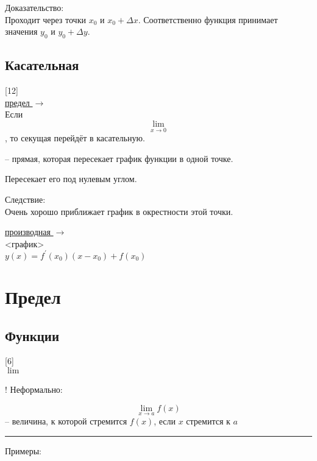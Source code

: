 \documentclass{article}
\begin{document}
Доказательство:\\
Проходит через точки $x_0$ и $x_0 + \Delta x$. Соответственно функция принимает значения $y_0$ и $y_0 + \Delta y$.

\subsection{Касательная}
[12]\\
\label{section:tangent}
\hyperref[section:limit]{предел $\to$}\\
Если $$\lim_{x \to 0}$$, то секущая перейдёт в касательную.

-- прямая, которая пересекает график функции в одной точке.

Пересекает его под нулевым углом.

Следствие:\\
Очень хорошо приближает график в окрестности этой точки.

\hyperref[section:derivative]{производная $\to$}\\
<график>\\
$y(x) = f^\prime (x_0)(x - x_0) + f(x_0)$


\section{Предел}
\label{section:limit}
\subsection{Функции}
[6]\\
$\lim_{}$

! Неформально:

$$\lim_{x \to a} f(x)$$ -- величина, к которой стремится $f(x)$, если $x$ стремится к $a$

\noindent\rule{\textwidth}{1pt}

Примеры:
\end{document}
